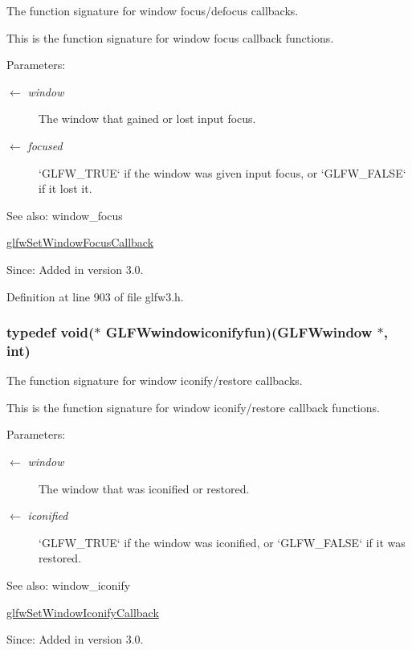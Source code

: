 The function signature for window focus/defocus callbacks. 

This is the function signature for window focus callback functions.

\begin{Desc}
\item[Parameters:]
\begin{description}
\item[\mbox{$\leftarrow$} {\em window}]The window that gained or lost input focus. \item[\mbox{$\leftarrow$} {\em focused}]`GLFW\_\-TRUE` if the window was given input focus, or `GLFW\_\-FALSE` if it lost it.\end{description}
\end{Desc}
\begin{Desc}
\item[See also:]window\_\-focus 

\hyperlink{group__window_gc89c6534ba7fbab6f6c68b855656c0d4}{glfwSetWindowFocusCallback}\end{Desc}
\begin{Desc}
\item[Since:]Added in version 3.0. \end{Desc}


Definition at line 903 of file glfw3.h.\hypertarget{group__window_ge47ae066eea9fe6050a62360928ae524}{
\subsubsection[GLFWwindowiconifyfun]{\setlength{\rightskip}{0pt plus 5cm}typedef void($\ast$  {\bf GLFWwindowiconifyfun})({\bf GLFWwindow} $\ast$, int)}}
\label{group__window_ge47ae066eea9fe6050a62360928ae524}


The function signature for window iconify/restore callbacks. 

This is the function signature for window iconify/restore callback functions.

\begin{Desc}
\item[Parameters:]
\begin{description}
\item[\mbox{$\leftarrow$} {\em window}]The window that was iconified or restored. \item[\mbox{$\leftarrow$} {\em iconified}]`GLFW\_\-TRUE` if the window was iconified, or `GLFW\_\-FALSE` if it was restored.\end{description}
\end{Desc}
\begin{Desc}
\item[See also:]window\_\-iconify 

\hyperlink{group__window_g17cd86946117b56c76397530900519db}{glfwSetWindowIconifyCallback}\end{Desc}
\begin{Desc}
\item[Since:]Added in version 3.0. \end{Desc}


